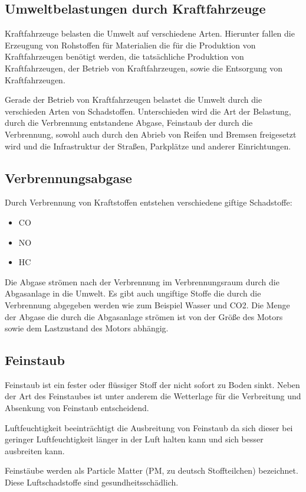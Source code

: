 \subsection{Umweltbelastungen durch Kraftfahrzeuge}
Kraftfahrzeuge belasten die Umwelt auf verschiedene Arten.
Hierunter fallen
die Erzeugung von Rohstoffen für Materialien die für die Produktion von Kraftfahrzeugen benötigt werden,
die tatsächliche Produktion von Kraftfahrzeugen,
der Betrieb von Kraftfahrzeugen,
sowie die Entsorgung von Kraftfahrzeugen.

Gerade der Betrieb von Kraftfahrzeugen belastet die Umwelt durch die verschieden Arten von Schadstoffen.
Unterschieden wird die Art der Belastung,
durch die Verbrennung entstandene Abgase,
Feinstaub der durch die Verbrennung, sowohl auch durch den Abrieb von Reifen und Bremsen freigesetzt wird
und die Infrastruktur der Straßen, Parkplätze und anderer Einrichtungen.

\subsection{Verbrennungsabgase}
Durch Verbrennung von Kraftstoffen entstehen verschiedene giftige Schadstoffe:
\begin{itemize}
	\item {\ac{CO}}
	\item {\ac{NO}}
	\item {\ac{HC}}
\end{itemize}
Die Abgase strömen nach der Verbrennung im Verbrennungsraum durch die Abgasanlage in die Umwelt.
Es gibt auch ungiftige Stoffe die durch die Verbrennung abgegeben werden wie zum Beispiel \ac{Wasser} und \ac{CO2}.
Die Menge der Abgase die durch die Abgasanlage strömen ist von der Größe des Motors sowie dem Lastzustand des Motors abhängig.

\subsection{Feinstaub}
Feinstaub ist ein fester oder flüssiger Stoff der nicht sofort zu Boden sinkt.
Neben der Art des Feinstaubes ist unter anderem die Wetterlage für die Verbreitung und Absenkung von Feinstaub entscheidend.

Luftfeuchtigkeit beeinträchtigt die Ausbreitung von Feinstaub da sich dieser bei geringer Luftfeuchtigkeit länger in der Luft halten kann und sich besser ausbreiten kann.

Feinstäube werden als Particle Matter (PM, zu deutsch Stoffteilchen) bezeichnet. Diese Luftschadstoffe sind gesundheitsschädlich.

